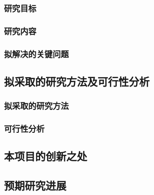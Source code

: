 \documentclass{ctexart}
\begin{document}
\subsubsection{研究目标}
\subsubsection{研究内容}
\subsubsection{拟解决的关键问题}
\subsection{拟采取的研究方法及可行性分析}
\subsubsection{拟采取的研究方法}
\subsubsection{可行性分析}

\subsection{本项目的创新之处}
\subsection{预期研究进展}
\end{document}
